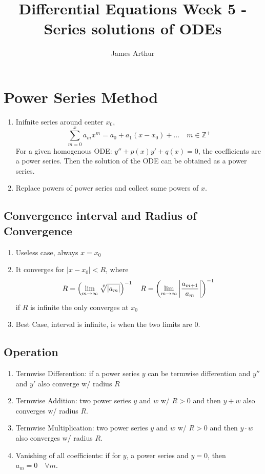 \documentclass{article}
\title{Differential Equations Week 5 - Series solutions of ODEs}
\author{James Arthur}
\newcommand{\Z}{\mathbb{Z}}
\begin{document}
\maketitle
\tableofcontents\newpage


\section{Power Series Method}
\begin{enumerate}
  \item Inifnite series around center $x_0$,
  $$ \sum_{m = 0}^x {a_mx^m} = a_0 + a_1(x -x_0) + \dots \quad m\in\Z^+$$
  For a given homogenous ODE: $\displaystyle{y'' +p(x)y' + q(x) = 0}$, the coefficients are a power series. Then the solution of the ODE can be obtained as a power series.
  \item Replace powers of power series and collect same powers of $x$.
\end{enumerate}

\subsection{Convergence interval and Radius of Convergence}
\begin{enumerate}
  \item Useless case, always $x = x_0$
  \item It converges for $|x - x_0| < R$, where
  $$ R = \left({\lim_{m\to\infty}{{\sqrt[\leftroot{-3}\uproot{3}p]{|a_m|}}}}\right)^{-1} \quad R = \left(\lim_{m\to\infty}{\left|\frac{a_{m+1}}{a_m}\right|}\right)^{-1} $$
  if $R$ is infinite the only converges at $x_0$
  \item Best Case, interval is infinite, is when the two limits are 0.
\end{enumerate}

\subsection{Operation}
\begin{enumerate}
  \item Termwise Differention: if a power series $y$ can be termwise differention and $y''$ and $y'$ also converge w/ radius $R$
  \item Termwise Addition: two power series $y$ and $w$ w/ $R > 0$ and then $y + w$ also converges w/ radius $R$.
  \item Termwise Multiplication: two power series $y$ and $w$ w/ $R > 0$ and then $y \cdot w$ also converges w/ radius $R$.
  \item Vanishing of all coefficients: if for $y$, a power series and $y = 0$, then $a_m = 0 \quad\forall m$.
\end{enumerate}
\end{document}
